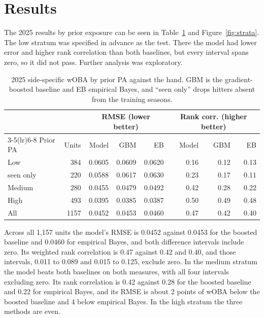 \documentclass[11pt,letterpaper]{article}
\begin{document}
\section{Results}
\label{sec:results}
\label{sec:test}

The 2025 results by prior exposure can be seen in Table~\ref{tab:test} and Figure~\ref{fig:strata}. The low stratum was specified in advance as the test. There the model had lower error and higher rank correlation than both baselines, but every interval spans zero, so it did not pass. Further analysis was exploratory.

\begin{table}[!ht]
\centering\small
\begin{tabular}{lrrrrrrr}
\toprule
 & & \multicolumn{3}{c}{RMSE (lower better)} & \multicolumn{3}{c}{Rank corr. (higher better)} \\
\cmidrule(lr){3-5}\cmidrule(lr){6-8}
Prior PA & Units & Model & GBM & EB & Model & GBM & EB \\
\midrule
Low & 384 & 0.0605 & 0.0609 & 0.0620 & 0.16 & 0.12 & 0.13 \\
\quad seen only & 220 & 0.0588 & 0.0617 & 0.0630 & 0.23 & 0.17 & 0.11 \\
Medium & 280 & 0.0455 & 0.0479 & 0.0492 & 0.42 & 0.28 & 0.22 \\
High & 493 & 0.0395 & 0.0385 & 0.0387 & 0.50 & 0.49 & 0.48 \\
All & 1157 & 0.0452 & 0.0453 & 0.0460 & 0.47 & 0.42 & 0.40 \\\bottomrule
\end{tabular}
\caption{2025 side-specific wOBA by prior PA against the hand. GBM is the gradient-boosted baseline and EB empirical Bayes, and ``seen only'' drops hitters absent from the training seasons.}
\label{tab:test}
\end{table}

Across all 1,157 units the model's RMSE is 0.0452 against 0.0453 for the boosted baseline and 0.0460 for empirical Bayes, and both difference intervals include zero. Its weighted rank correlation is 0.47 against 0.42 and 0.40, and those intervals, 0.011 to 0.089 and 0.015 to 0.125, exclude zero. In the medium stratum the model beats both baselines on both measures, with all four intervals excluding zero. Its rank correlation is 0.42 against 0.28 for the boosted baseline and 0.22 for empirical Bayes, and its RMSE is about 2 points of wOBA below the boosted baseline and 4 below empirical Bayes. In the high stratum the three methods are even.
\end{document}
